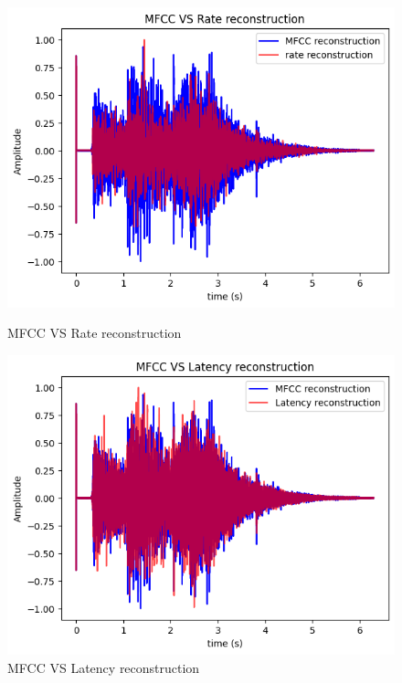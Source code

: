 \documentclass[11pt]{article}
\begin{document}
\begin{figure}[h]
  \centering
  \begin{minipage}{0.45\textwidth}
    \centering
    \includegraphics[width=1\textwidth]{"image/MFCC VS Rate reconstruction.png"}
    \caption{MFCC VS Rate reconstruction}
    \label{fig:MVSR}
  \end{minipage}\hfill
  \begin{minipage}{0.45\textwidth}
    \centering
    \includegraphics[width=1\textwidth]{"image/MFCC VS Latency reconstruction.png"}
    \caption{MFCC VS Latency reconstruction}
    \label{fig:MVSL}
  \end{minipage}
\end{figure}
\end{document}
